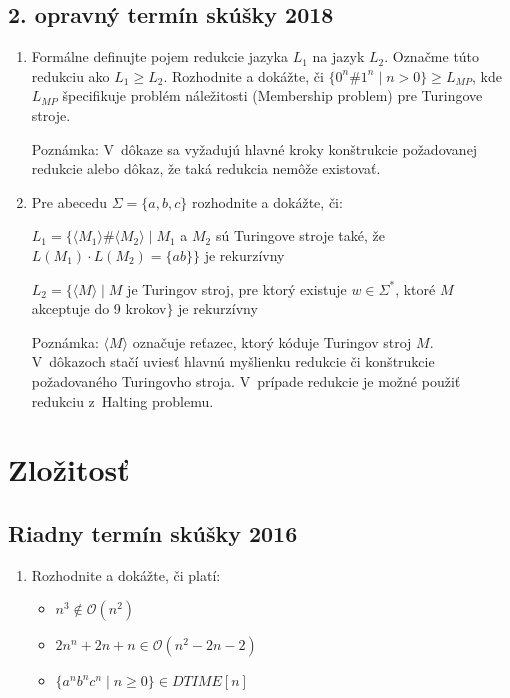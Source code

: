 \documentclass[11pt,a4paper]{article}
\begin{document}
		\subsection{2. opravný termín skúšky 2018}
		
		\begin{enumerate}
			\item Formálne definujte pojem redukcie jazyka $L_1$ na jazyk $L_2$. Označme túto redukciu ako $L_1 \geq L_2$. Rozhodnite a dokážte, či $\{0^n\#1^n \mid n > 0\} \geq L_{MP}$, kde $L_{MP}$ špecifikuje problém náležitosti (Membership problem) pre Turingove stroje.
		
			Poznámka: V~dôkaze sa vyžadujú hlavné kroky konštrukcie požadovanej redukcie alebo dôkaz, že taká redukcia nemôže existovať.
			
			\item Pre abecedu $\Sigma = \{a, b, c\}$ rozhodnite a dokážte, či:
			
			$L_1 = \{\langle M_1 \rangle \# \langle M_2 \rangle \mid M_1$ a $M_2$  sú Turingove stroje také, že $L(M_1) \cdot L(M_2) = \{ab\}\}$ je rekurzívny
			
			$L_2 = \{\langle M \rangle \mid M$ je Turingov stroj, pre ktorý existuje $w \in \Sigma^*$, ktoré $M$ akceptuje do 9 krokov$\}$ je rekurzívny
			
			Poznámka: $\langle M \rangle$ označuje reťazec, ktorý kóduje Turingov stroj $M$. V~dôkazoch stačí uviesť hlavnú myšlienku redukcie či konštrukcie požadovaného Turingovho stroja. V~prípade redukcie je možné použiť redukciu z~Halting problemu.
		\end{enumerate}	

	\section{Zložitosť}

		\subsection{Riadny termín skúšky 2016}

		\begin{enumerate}
			\item Rozhodnite a dokážte, či platí:
			
			\begin{itemize}
				\item $n^3 \notin \mathcal{O}(n^2)$		
				\item $2n^n + 2n + n \in \mathcal{O}(n^2 - 2n - 2)$	
				\item $\{a^nb^nc^n \mid n \geq 0\} \in DTIME[n]$
			\end{itemize}
		\end{enumerate}	
\end{document}
